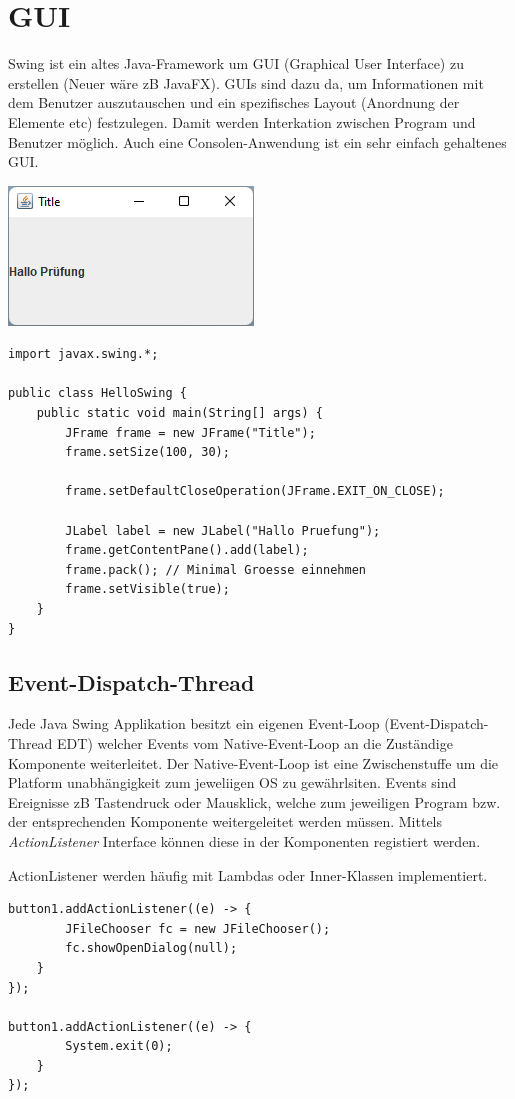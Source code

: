 \section{GUI}
Swing ist ein altes Java-Framework um GUI (Graphical User Interface) zu erstellen (Neuer wäre zB JavaFX). GUIs sind dazu da, um Informationen mit dem Benutzer auszutauschen und ein spezifisches Layout (Anordnung der Elemente etc) festzulegen. Damit werden Interkation zwischen Program und Benutzer möglich. Auch eine Consolen-Anwendung ist ein sehr einfach gehaltenes GUI.

\begin{center}
	\includegraphics[width=0.3\columnwidth]{Images/swing1}
\end{center}
\begin{lstlisting}
import javax.swing.*;
	
public class HelloSwing {
	public static void main(String[] args) {
		JFrame frame = new JFrame("Title");
		frame.setSize(100, 30);
		
		frame.setDefaultCloseOperation(JFrame.EXIT_ON_CLOSE);
		
		JLabel label = new JLabel("Hallo Pruefung");
		frame.getContentPane().add(label);
		frame.pack(); // Minimal Groesse einnehmen
		frame.setVisible(true);
	}
}
\end{lstlisting}




\subsection{Event-Dispatch-Thread}
Jede Java Swing Applikation besitzt ein eigenen Event-Loop (Event-Dispatch-Thread EDT) welcher Events vom Native-Event-Loop an die Zuständige Komponente weiterleitet. Der Native-Event-Loop ist eine Zwischenstuffe um die Platform unabhängigkeit zum jeweliigen OS zu gewährlsiten. Events sind Ereignisse zB Tastendruck oder Mausklick, welche zum jeweiligen Program bzw. der entsprechenden Komponente weitergeleitet werden müssen. Mittels \textit{ActionListener} Interface können diese in der Komponenten registiert werden.

ActionListener werden häufig mit Lambdas oder Inner-Klassen implementiert.
\begin{lstlisting}
button1.addActionListener((e) -> {
		JFileChooser fc = new JFileChooser();
		fc.showOpenDialog(null);
	}
});

button1.addActionListener((e) -> {
		System.exit(0);
	}
});
\end{lstlisting}


